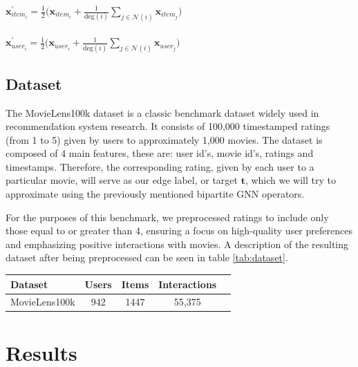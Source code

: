 \documentclass{scrartcl}
\begin{document}
\begin{center}
    $\mathbf{x}^{\prime}_{item_{i}} = \frac{1}{2}\big(\mathbf{x}_{item_{i}} +
    \frac{1}{\textrm{deg}(i)}
    \sum_{j \in \mathcal{N}(i)}  \mathbf{x}_{item_{j}} \big)$ \\~\\
    $\mathbf{x}^{\prime}_{user_{i}} = \frac{1}{2}\big(\mathbf{x}_{user_{i}} +
    \frac{1}{\textrm{deg}(i)}
    \sum_{j \in \mathcal{N}(i)} \mathbf{x}_{user_{j}} \big)$
\end{center}

\subsection{Dataset}

\quad The MovieLens100k dataset is a classic benchmark dataset widely used in recommendation system research. It consists of 100,000 timestamped ratings (from 1 to 5) given by users to approximately 1,000 movies. The dataset is composed of 4 main features, these are: user id's, movie id's, ratings and timestamps. Therefore, the corresponding rating, given by each user to a particular movie, will serve as our edge label, or target $\mathbf{t}$, which we will try to approximate using the previously mentioned bipartite GNN operators. 

For the purposes of this benchmark, we preprocessed ratings to include only those equal to or greater than 4, ensuring a focus on high-quality user preferences and emphasizing positive interactions with movies. A description of the resulting dataset after being preprocessed can be seen in table \ref{tab:dataset}. \\ 

\begin{center}
\begin{tabular}{|l|*{4}{c|}}
\hline
                        Dataset & Users    & Items    & Interactions   \\ \hline
MovieLens100k\cite{movielens}               & 942 & 1447 & 55,375 \\ \hline
\end{tabular}
\label{tab:dataset}
\end{center}


\section{Results}
\end{document}
